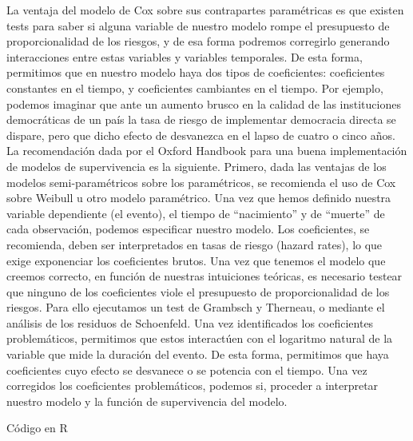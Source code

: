 \documentclass[]{book}
\begin{document}
La ventaja del modelo de Cox sobre sus contrapartes paramétricas es que
existen tests para saber si alguna variable de nuestro modelo rompe el
presupuesto de proporcionalidad de los riesgos, y de esa forma podremos
corregirlo generando interacciones entre estas variables y variables
temporales. De esta forma, permitimos que en nuestro modelo haya dos
tipos de coeficientes: coeficientes constantes en el tiempo, y
coeficientes cambiantes en el tiempo. Por ejemplo, podemos imaginar que
ante un aumento brusco en la calidad de las instituciones democráticas
de un país la tasa de riesgo de implementar democracia directa se
dispare, pero que dicho efecto de desvanezca en el lapso de cuatro o
cinco años. La recomendación dada por el Oxford Handbook para una buena
implementación de modelos de supervivencia es la siguiente. Primero,
dada las ventajas de los modelos semi-paramétricos sobre los
paramétricos, se recomienda el uso de Cox sobre Weibull u otro modelo
paramétrico. Una vez que hemos definido nuestra variable dependiente (el
evento), el tiempo de ``nacimiento'' y de ``muerte'' de cada
observación, podemos especificar nuestro modelo. Los coeficientes, se
recomienda, deben ser interpretados en tasas de riesgo (hazard rates),
lo que exige exponenciar los coeficientes brutos. Una vez que tenemos el
modelo que creemos correcto, en función de nuestras intuiciones
teóricas, es necesario testear que ninguno de los coeficientes viole el
presupuesto de proporcionalidad de los riesgos. Para ello ejecutamos un
test de Grambsch y Therneau, o mediante el análisis de los residuos de
Schoenfeld. Una vez identificados los coeficientes problemáticos,
permitimos que estos interactúen con el logaritmo natural de la variable
que mide la duración del evento. De esta forma, permitimos que haya
coeficientes cuyo efecto se desvanece o se potencia con el tiempo. Una
vez corregidos los coeficientes problemáticos, podemos si, proceder a
interpretar nuestro modelo y la función de supervivencia del modelo.

Código en R


\end{document}
